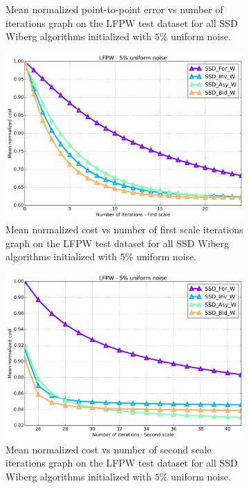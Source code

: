 \begin{figure}[h!]
\begin{subfigure}{0.48\textwidth}
	    \caption{Mean normalized point-to-point error vs number of iterations graph on the LFPW test dataset for all SSD Wiberg algorithms initialized with $5\%$ uniform noise.}
	    \label{fig:mean_error_vs_iters_ssd_w_5}
	\end{subfigure}
	\par\medskip
	\begin{subfigure}{0.48\textwidth}
	    \includegraphics[width=\textwidth]{experiments/algorithms/ssd_w/mean_cost_vs_iters1_ssd_w_5.png}
	    \caption{Mean normalized cost vs number of first scale iterations graph on the LFPW test dataset for all SSD Wiberg algorithms initialized with $5\%$ uniform noise.}
	    \label{fig:mean_cost_vs_iters1_ssd_w_5}
	\end{subfigure}
	\hfill
	\begin{subfigure}{0.48\textwidth}
	    \includegraphics[width=\textwidth]{experiments/algorithms/ssd_w/mean_cost_vs_iters2_ssd_w_5.png}
	    \caption{Mean normalized cost vs number of second scale iterations graph on the LFPW test dataset for all SSD Wiberg algorithms initialized with $5\%$ uniform noise.}
	    \label{fig:mean_cost_vs_iters2_ssd_w_5}
	\end{subfigure}
	\label{fig:ssd_w_5}
	\caption{}
\end{figure}


